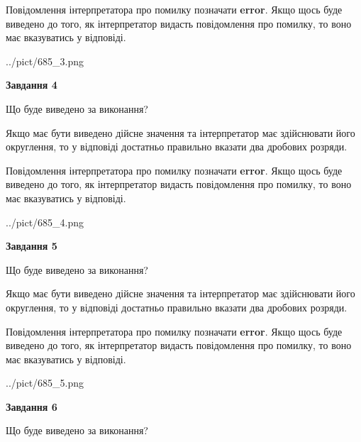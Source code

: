 \documentclass[12pt, ukrainian]{article}
\begin{document}
{\begin {Large}
Повідомлення інтерпретатора про помилку позначати \textbf{error}.
Якщо щось буде виведено до того, як інтерпретатор видасть повідомлення про помилку, 
то воно має вказуватись у відповіді. \par

\begin{center}
	{../pict/685_3.png}
\end{center}
\newpage

{\begin {center}\textbf{Завдання 4}\end {center}}\par
Що буде виведено за виконання? \par

Якщо має бути виведено дійсне значення та інтерпретатор має здійснювати його округлення, 
то у відповіді достатньо правильно вказати два дробових розряди.

Повідомлення інтерпретатора про помилку позначати \textbf{error}.
Якщо щось буде виведено до того, як інтерпретатор видасть повідомлення про помилку, 
то воно має вказуватись у відповіді. \par

\begin{center}
	{../pict/685_4.png}
\end{center}
\newpage

{\begin {center}\textbf{Завдання 5}\end {center}}\par
Що буде виведено за виконання? \par

Якщо має бути виведено дійсне значення та інтерпретатор має здійснювати його округлення, 
то у відповіді достатньо правильно вказати два дробових розряди.

Повідомлення інтерпретатора про помилку позначати \textbf{error}.
Якщо щось буде виведено до того, як інтерпретатор видасть повідомлення про помилку, 
то воно має вказуватись у відповіді. \par

\begin{center}
	{../pict/685_5.png}
\end{center}
\newpage

{\begin {center}\textbf{Завдання 6}\end {center}}\par
Що буде виведено за виконання? \par


\end{Large}}
\end{document}
